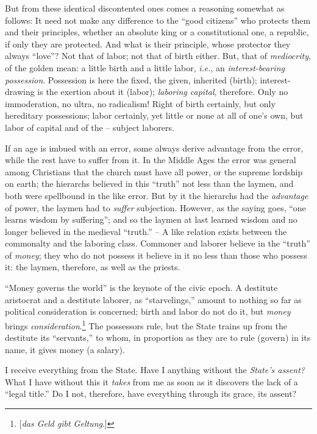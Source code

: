 But from these identical discontented ones comes a reasoning somewhat as 
follows: It need not make any difference to the ``good citizens'' who 
protects them and their principles, whether an absolute king or a 
constitutional one, a republic, if only they are protected. And what is their 
principle, whose protector they always ``love''? Not that of labor; not that 
of birth either. But, that of \textit{mediocrity}, of the golden mean: a 
little birth and a little labor, \textit{i.e.}, an \textit{interest-bearing 
possession}. Possession is here the fixed, the given, inherited (birth); 
interest-drawing is the exertion about it (labor); \textit{laboring capital}, 
therefore. Only no immoderation, no ultra, no radicalism! Right of birth 
certainly, but only hereditary possessions; labor certainly, yet little or 
none at all of one's own, but labor of capital and of the -- subject laborers.

If an age is imbued with an error, some always derive advantage from the 
error, while the rest have to suffer from it. In the Middle Ages the error was 
general among Christians that the church must have all power, or the supreme 
lordship on earth; the hierarchs believed in this ``truth'' not less than 
the laymen, and both were spellbound in the like error. But by it the 
hierarchs had the \textit{advantage} of power, the laymen had to 
\textit{suffer} subjection. However, as the saying goes, ``one learns wisdom 
by suffering''; and so the laymen at last learned wisdom and no longer 
believed in the medieval ``truth.'' -- A like relation exists between the 
commonalty and the laboring class. Commoner and laborer believe in the 
``truth'' of \textit{money}; they who do not possess it believe in it no 
less than those who possess it: the laymen, therefore, as well as the priests.

``Money governs the world'' is the keynote of the civic epoch. A destitute 
aristocrat and a destitute laborer, as ``starvelings,'' amount to nothing so 
far as political consideration is concerned; birth and labor do not do it, but 
\textit{money} brings \textit{consideration}.\footnote{[\textit{das Geld gibt 
Geltung}.]} The possessors rule, but the State trains up from the destitute 
its ``servants,'' to whom, in proportion as they are to rule (govern) in its 
name, it gives money (a salary).

I receive everything from the State. Have I anything without the 
\textit{State's assent?} What I have without this it \textit{takes} from me as 
soon as it discovers the lack of a ``legal title.'' Do I not, therefore, 
have everything through its grace, its assent?

